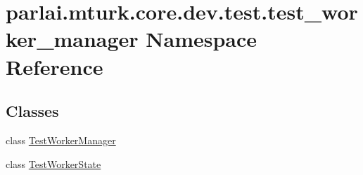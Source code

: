 \hypertarget{namespaceparlai_1_1mturk_1_1core_1_1dev_1_1test_1_1test__worker__manager}{}\section{parlai.\+mturk.\+core.\+dev.\+test.\+test\+\_\+worker\+\_\+manager Namespace Reference}
\label{namespaceparlai_1_1mturk_1_1core_1_1dev_1_1test_1_1test__worker__manager}
\subsection*{Classes}
\begin{DoxyCompactItemize}
\item 
class \hyperlink{classparlai_1_1mturk_1_1core_1_1dev_1_1test_1_1test__worker__manager_1_1TestWorkerManager}{Test\+Worker\+Manager}
\item 
class \hyperlink{classparlai_1_1mturk_1_1core_1_1dev_1_1test_1_1test__worker__manager_1_1TestWorkerState}{Test\+Worker\+State}
\end{DoxyCompactItemize}
